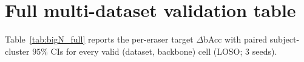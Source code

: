 \appendix
\section{Full multi-dataset validation table}
\label{app:bigN}
Table~\ref{tab:bigN_full} reports the per-eraser target $\Delta$bAcc with paired subject-cluster $95\%$ CIs for every valid (dataset, backbone) cell (LOSO; $3$ seeds).

